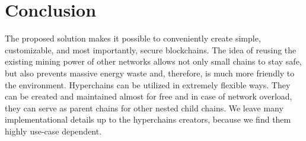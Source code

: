 \section{Conclusion}

The proposed solution makes it possible to conveniently create simple,
customizable, and most importantly, secure blockchains. The idea of reusing the
existing mining power of other networks allows not only small chains to stay
safe, but also prevents massive energy waste and, therefore, is much more
friendly to the environment. Hyperchains can be utilized in extremely flexible
ways. They can be created and maintained almost for free and in case of network
overload, they can serve as parent chains for other nested child chains. We
leave many implementational details up to the hyperchains creators, because we
find them highly use-case dependent.
